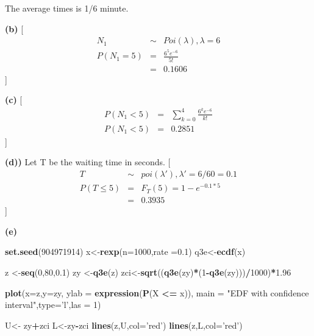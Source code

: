 \documentclass[
]{article}
\newenvironment{Shaded}{\begin{snugshade}}{\end{snugshade}}
\newcommand{\DataTypeTok}[1]{\textcolor[rgb]{0.13,0.29,0.53}{#1}}
\newcommand{\DecValTok}[1]{\textcolor[rgb]{0.00,0.00,0.81}{#1}}
\newcommand{\FloatTok}[1]{\textcolor[rgb]{0.00,0.00,0.81}{#1}}
\newcommand{\KeywordTok}[1]{\textcolor[rgb]{0.13,0.29,0.53}{\textbf{#1}}}
\newcommand{\NormalTok}[1]{#1}
\newcommand{\OperatorTok}[1]{\textcolor[rgb]{0.81,0.36,0.00}{\textbf{#1}}}
\newcommand{\StringTok}[1]{\textcolor[rgb]{0.31,0.60,0.02}{#1}}
\begin{document}
The average times is 1/6 minute.

\textbf{(b)} {[} \begin{eqnarray}
N_1 &\sim& Poi(\lambda),\lambda=6\\
P(N_1 = 5) &=& \frac{6^5e^{-6}}{5!} \\
&=& 0.1606


\end{eqnarray} {]}

\textbf{(c)} {[} \begin{eqnarray}
P(N_1 < 5) &=& \sum_{k=0}^{4}\frac{6^ke^{-6}}{k!} \\
P(N_1 < 5) &=& 0.2851

\end{eqnarray} {]}

\textbf{(d))} Let T be the waiting time in seconds. {[} \begin{eqnarray}
T&\sim& poi(\lambda'),\lambda'=6/60=0.1\\
P(T \leq 5) &=& F_T(5)=1-{e^{-0.1 * 5}} \\
&=&0.3935

\end{eqnarray} {]}

\textbf{(e)}

\begin{Shaded}
\begin{Highlighting}[]
\KeywordTok{set.seed}\NormalTok{(}\DecValTok{904971914}\NormalTok{)}
\NormalTok{x<-}\KeywordTok{rexp}\NormalTok{(}\DataTypeTok{n=}\DecValTok{1000}\NormalTok{,}\DataTypeTok{rate =}\FloatTok{0.1}\NormalTok{)}
\NormalTok{q3e<-}\KeywordTok{ecdf}\NormalTok{(x)}

\NormalTok{z <-}\KeywordTok{seq}\NormalTok{(}\DecValTok{0}\NormalTok{,}\DecValTok{80}\NormalTok{,}\FloatTok{0.1}\NormalTok{)}
\NormalTok{zy <-}\KeywordTok{q3e}\NormalTok{(z)}
\NormalTok{zci<-}\KeywordTok{sqrt}\NormalTok{((}\KeywordTok{q3e}\NormalTok{(zy)}\OperatorTok{*}\NormalTok{(}\DecValTok{1}\OperatorTok{-}\KeywordTok{q3e}\NormalTok{(zy)))}\OperatorTok{/}\DecValTok{1000}\NormalTok{)}\OperatorTok{*}\FloatTok{1.96} 

\KeywordTok{plot}\NormalTok{(}\DataTypeTok{x=}\NormalTok{z,}\DataTypeTok{y=}\NormalTok{zy, }\DataTypeTok{ylab =} \KeywordTok{expression}\NormalTok{(}\KeywordTok{P}\NormalTok{(X }\OperatorTok{<=}\StringTok{ }\NormalTok{x)), }\DataTypeTok{main =} \StringTok{"EDF with confidence interval"}\NormalTok{,}\DataTypeTok{type=}\StringTok{'l'}\NormalTok{,}\DataTypeTok{las =} \DecValTok{1}\NormalTok{)}

\NormalTok{U<-}\StringTok{ }\NormalTok{zy}\OperatorTok{+}\NormalTok{zci}
\NormalTok{L<-zy}\OperatorTok{-}\NormalTok{zci}
\KeywordTok{lines}\NormalTok{(z,U,}\DataTypeTok{col=}\StringTok{'red'}\NormalTok{)}
\KeywordTok{lines}\NormalTok{(z,L,}\DataTypeTok{col=}\StringTok{'red'}\NormalTok{)}
\end{Highlighting}
\end{Shaded}
\end{document}
